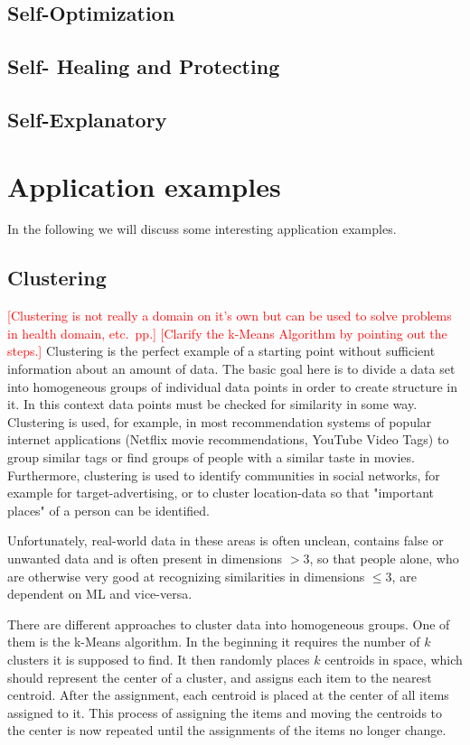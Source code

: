 \documentclass[conference]{IEEEtran}
\newcommand\notes[1]{\textcolor{red}{#1}}
\begin{document}
\subsection{Self-Optimization}
\subsection{Self- Healing and Protecting}
\subsection{Self-Explanatory}


\section{Application examples}
In the following we will discuss some interesting application examples.

\subsection{Clustering}
\notes{[Clustering is not really a domain on it's own but can be used to solve problems in health domain, etc.\ pp.]}
\notes{[Clarify the k-Means Algorithm by pointing out the steps.]}
Clustering is the perfect example of a starting point without sufficient information about an amount of data. 
The basic goal here is to divide a data set into homogeneous groups of individual data points in order to create structure in it.
In this context data points must be checked for similarity in some way.
Clustering is used, for example, in most recommendation systems of popular internet applications (Netflix movie recommendations, YouTube Video Tags\cite{YouTube:pasca}) to group similar tags or find groups of people with a similar taste in movies.
Furthermore, clustering is used to identify communities in social networks, for example for target-advertising, or to cluster location-data so that "important places" of a person can be identified\cite{DJ:frankowski}.

Unfortunately, real-world data in these areas is often unclean, contains false or unwanted data and is often present in 
dimensions $>$3, so that people alone, who are otherwise very good at recognizing similarities in dimensions $\le3$, are dependent on ML and vice-versa.

There are different approaches to cluster data into homogeneous groups. One of them is the k-Means algorithm\cite{FoundationsOfML:mohri}. In the beginning it requires the number of $k$ clusters it is supposed to find. 
It then randomly places $k$ centroids in space, which should represent the center of a cluster, and assigns each item to the nearest centroid. After the assignment, each centroid is placed at the center of all items assigned to it. This process of assigning the items and moving the centroids to
the center is now repeated until the assignments of the items no longer change.
\end{document}
